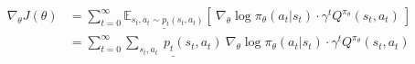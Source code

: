 \begin{align}
\nabla_\theta J(\theta) &= \sum_{t=0}^{\infty} \underline{\mathbb{E}_{s_t,a_t \sim p_t(s_t,a_t)}} \left\lbrack\ \nabla_\theta\log \pi_\theta(a_t|s_t)\cdot \gamma^t Q^{\pi_\theta}(s_t, a_t) \ \right\rbrack \\
&= \sum_{t=0}^{\infty} \underline{\sum_{s_t,a_t} \ p_t(s_t, a_t)} \ \nabla_\theta\log \pi_\theta(a_t|s_t)\cdot \gamma^t Q^{\pi_\theta}(s_t, a_t)
\end{align}